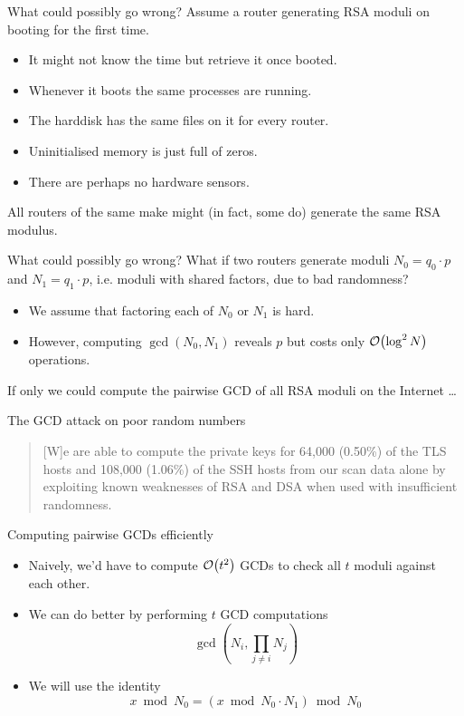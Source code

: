 \documentclass[presentation,smaller]{beamer}
\begin{document}
\begin{frame}[label={sec:orgheadline13}]{What could possibly go wrong?}
Assume a router generating RSA moduli on booting for the first time.

\begin{itemize}
\item It might not know the time but retrieve it once booted.
\item Whenever it boots the same processes are running.
\item The harddisk has the same files on it for every router.
\item Uninitialised memory is just full of zeros.
\item There are perhaps no hardware sensors.
\end{itemize}

All routers of the same make might (in fact, some do) generate the \alert{same} RSA modulus.
\end{frame}

\begin{frame}[label={sec:orgheadline14}]{What could possibly go wrong?}
What if two routers generate moduli \(N_0 = q_0 ⋅ p\) and \(N_1 = q_1 \cdot p\), i.e. moduli with shared factors, due to bad randomness?

\begin{itemize}
\item We assume that factoring each of \(N_0\) or \(N_1\) is hard.
\item However, computing \(\gcd(N_0, N_1)\) reveals \(p\) but costs only \(\bigO{\log^2 N}\) operations.
\end{itemize}

\pause
If only we could compute the pairwise GCD of all RSA moduli on the Internet \dots{}
\end{frame}

\begin{frame}[label={sec:orgheadline15}]{The GCD attack on poor random numbers}
\begin{quote}
[W]e are able to compute the private keys for 64,000 (0.50\%) of the TLS hosts and 108,000 (1.06\%) of the SSH hosts from our scan data alone by exploiting known weaknesses of RSA and DSA when used with insufficient randomness.
\end{quote}
\end{frame}

\begin{frame}[label={sec:orgheadline16}]{Computing pairwise GCDs efficiently}
\begin{itemize}[<+->]
\item Naively, we’d have to compute \(\bigO{t^2}\) GCDs to check all \(t\) moduli against each other.
\item We can do better by performing \(t\) GCD computations \[\gcd(N_i, \prod_{j \neq i} N_j)\]
\item We will use the identity \[x \bmod N_0 = (x \bmod N_0⋅N_1) \bmod N_0\]
\end{itemize}
\end{frame}
\end{document}
